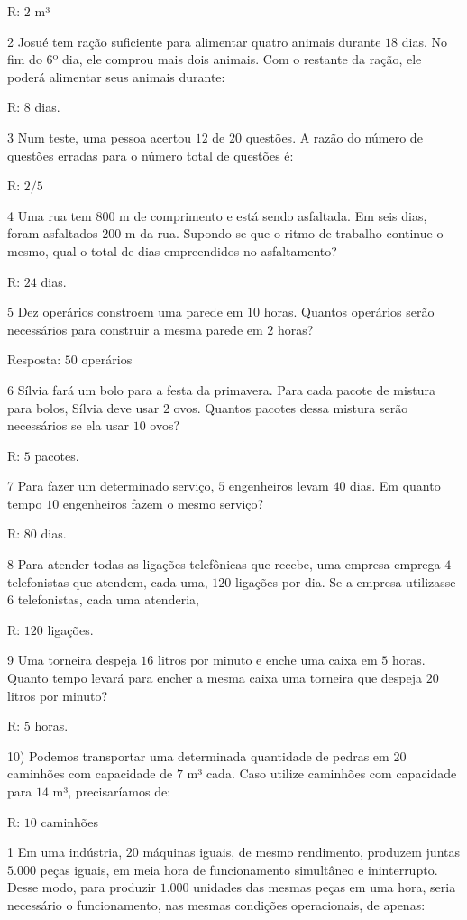 R: $2$ m³

\num{2}  Josué tem ração suficiente para alimentar quatro animais durante $18$
dias. No fim do $6$º dia, ele comprou mais dois animais. Com o restante da
ração, ele poderá alimentar seus animais durante:

R: $8$ dias.

\num{3}  Num teste, uma pessoa acertou $12$ de $20$ questões. A razão do número de
questões erradas para o número total de questões é:

R: $2/5$

\num{4}  Uma rua tem $800$ m de comprimento e está sendo asfaltada. Em seis
dias, foram asfaltados $200$ m da rua. Supondo-se que o ritmo de trabalho
continue o mesmo, qual o total de dias empreendidos no asfaltamento?

R: $24$ dias.

\num{5}  Dez operários constroem uma parede em $10$ horas. Quantos operários
serão necessários para construir a mesma parede em $2$ horas?

Resposta: $50$ operários

\num{6}  Sílvia fará um bolo para a festa da primavera. Para cada pacote de
mistura para bolos, Sílvia deve usar $2$ ovos. Quantos pacotes dessa
mistura serão necessários se ela usar $10$ ovos?

R: $5$ pacotes.

\num{7}  Para fazer um determinado serviço, $5$ engenheiros levam $40$ dias. Em
quanto tempo $10$ engenheiros fazem o mesmo serviço?

R: $80$ dias.

\num{8}  Para atender todas as ligações telefônicas que recebe, uma empresa
emprega $4$ telefonistas que atendem, cada uma, $120$ ligações por dia. Se a
empresa utilizasse $6$ telefonistas, cada uma atenderia,

R: $120$ ligações.

\num{9}  Uma torneira despeja $16$ litros por minuto e enche uma caixa em $5$
horas. Quanto tempo levará para encher a mesma caixa uma torneira que
despeja $20$ litros por minuto?

R: $5$ horas.

10) Podemos transportar uma determinada quantidade de pedras em $20$
caminhões com capacidade de $7$ m³ cada. Caso utilize caminhões com
capacidade para $14$ m³, precisaríamos de:

R: $10$ caminhões


\num{1}  Em uma indústria, $20$ máquinas iguais, de mesmo rendimento, produzem
juntas $5.000$ peças iguais, em meia hora de funcionamento simultâneo e
ininterrupto. Desse modo, para produzir $1.000$ unidades das mesmas peças
em uma hora, seria necessário o funcionamento, nas mesmas condições
operacionais, de apenas:

